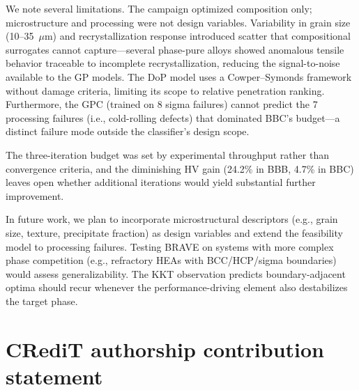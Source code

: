 \documentclass[preprint,12pt,times]{elsarticle}  %
\begin{document}
We note several limitations. The campaign optimized composition only; microstructure and processing were not design variables. Variability in grain size (10--35~$\mu$m) and recrystallization response introduced scatter that compositional surrogates cannot capture---several phase-pure alloys showed anomalous tensile behavior traceable to incomplete recrystallization, reducing the signal-to-noise available to the GP models. The DoP model uses a Cowper--Symonds framework without damage criteria, limiting its scope to relative penetration ranking. Furthermore, the GPC (trained on 8 sigma failures) cannot predict the 7 processing failures (i.e., cold-rolling defects) that dominated BBC's budget---a distinct failure mode outside the classifier's design scope.

The three-iteration budget was set by experimental throughput rather than convergence criteria, and the diminishing HV gain (24.2\% in BBB, 4.7\% in BBC) leaves open whether additional iterations would yield substantial further improvement.

In future work, we plan to incorporate microstructural descriptors (e.g., grain size, texture, precipitate fraction) as design variables and extend the feasibility model to processing failures. Testing BRAVE on systems with more complex phase competition (e.g., refractory HEAs with BCC/HCP/sigma boundaries) would assess generalizability. The KKT observation predicts boundary-adjacent optima should recur whenever the performance-driving element also destabilizes the target phase.

\section*{CRediT authorship contribution statement}
\end{document}
